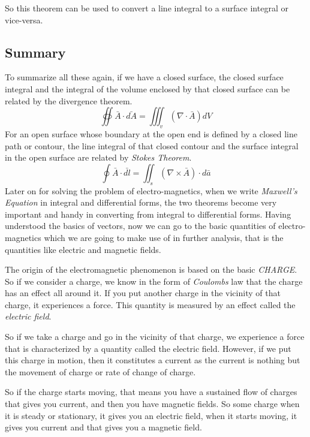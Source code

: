 So this theorem can be used to convert a line integral to a surface integral or vice-versa.

\begin{mdframed}[ backgroundcolor=lightblue, linewidth=1pt, hidealllines=true]
\subsection*{Summary}
To summarize all these again, if we have a closed surface, the closed surface integral and the integral of the volume enclosed by that closed surface can be related by the divergence theorem.
\begin{equation}
\oiint \bar{A}\cdot\bar{dA} = \iiint_v(\nabla\cdot\bar{A})dV
\end{equation}
For an open surface whose boundary at the open end is defined by a closed line path or contour, the line integral of that closed contour and the surface integral in the open surface are related by \emph{Stokes Theorem}.
\begin{equation}
\oint\bar{A}\cdot\bar{dl} = \iint_s(\nabla\times\bar{A})\cdot d\bar{a}
\end{equation}	
Later on for solving the problem of electro-magnetics, when we write \emph{Maxwell's Equation} in integral and differential forms, the two theorems become very important and handy in converting from integral to differential forms. Having understood the basics of vectors, now we can go to the basic quantities of electro-magnetics which we are going to make use of in further analysis, that is the quantities like electric and magnetic fields.

The origin of the electromagnetic phenomenon is based on the basic \emph{CHARGE}. So if we consider a charge, we know in the form of \emph{Coulombs} law that the charge has an effect all around it. If you put another charge in the vicinity of that charge, it experiences a force. This quantity is measured by an effect called the \emph{electric field}.

So if we take a charge and go in the vicinity of that charge, we experience a force that is characterized by a quantity called the electric field. However, if we put this charge in motion, then it constitutes a current as the current is nothing but the movement of charge or rate of change of charge.

So if the charge starts moving, that means you have a sustained flow of charges that gives you current, and then you have magnetic fields. So some charge when it is steady or stationary, it gives you an electric field, when it starts moving, it gives you current and that gives you a magnetic field.


\end{mdframed}

